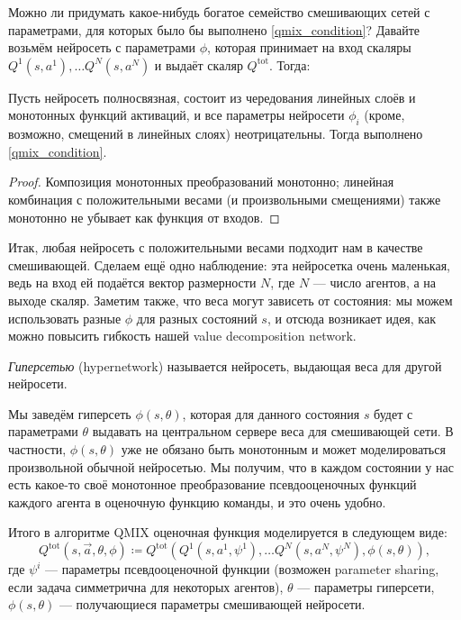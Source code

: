 Можно ли придумать какое-нибудь богатое семейство смешивающих сетей с параметрами, для которых было бы выполнено \eqref{qmix_condition}? Давайте возьмём нейросеть с параметрами $\phi$, которая принимает на вход скаляры $Q^1(s, a^1), \dots Q^N(s, a^N)$ и выдаёт скаляр $Q^{\mathrm{tot}}$. Тогда:
\begin{proposition}
Пусть нейросеть полносвязная, состоит из чередования линейных слоёв и монотонных функций активаций, и все параметры нейросети $\phi_i$ (кроме, возможно, смещений в линейных слоях) неотрицательны. Тогда выполнено \eqref{qmix_condition}.
\begin{proof}
Композиция монотонных преобразований монотонно; линейная комбинация с положительными весами (и произвольными смещениями) также монотонно не убывает как функция от входов.
\end{proof}
\end{proposition}

Итак, любая нейросеть с положительными весами подходит нам в качестве смешивающей. Сделаем ещё одно наблюдение: эта нейросетка очень маленькая, ведь на вход ей подаётся вектор размерности $N$, где $N$ --- число агентов, а на выходе скаляр. Заметим также, что веса могут зависеть от состояния: мы можем использовать разные $\phi$ для разных состояний $s$, и отсюда возникает идея, как можно повысить гибкость нашей value decomposition network.

\begin{definition}
\emph{Гиперсетью} (hypernetwork) называется нейросеть, выдающая веса для другой нейросети.
\end{definition}

Мы заведём гиперсеть $\phi(s, \theta)$, которая для данного состояния $s$ будет с параметрами $\theta$ выдавать на центральном сервере веса для смешивающей сети. В частности, $\phi(s, \theta)$ уже не обязано быть монотонным и может моделироваться произвольной обычной нейросетью. Мы получим, что в каждом состоянии у нас есть какое-то своё монотонное преобразование псевдооценочных функций каждого агента в оценочную функцию команды, и это очень удобно.

Итого в алгоритме QMIX оценочная функция моделируется в следующем виде:
$$Q^{\mathrm{tot}}(s, \vec{a}, \theta, \phi) \coloneqq Q^{\mathrm{tot}}( Q^1(s, a^1, \psi^1), \dots Q^N(s, a^N, \psi^N), \phi(s, \theta)),$$
где $\psi^i$ --- параметры псевдооценочной функции (возможен parameter sharing, если задача симметрична для некоторых агентов), $\theta$ --- параметры гиперсети, $\phi(s, \theta)$ --- получающиеся параметры смешивающей нейросети.

